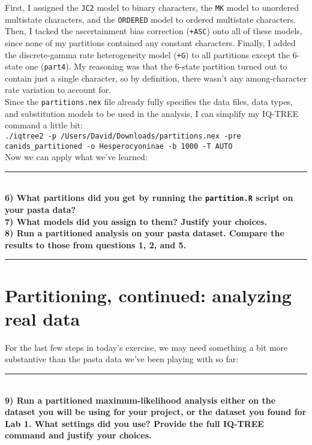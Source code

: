 \documentclass[12pt]{article}
\begin{document}
\noindent First, I assigned the \texttt{JC2} model to binary characters, the \texttt{MK} model to unordered multistate characters, and the \texttt{ORDERED} model to ordered multistate characters. Then, I tacked the ascertainment bias correction (\texttt{+ASC}) onto all of these models, since none of my partitions contained any constant characters. Finally, I added the discrete-gamma rate heterogeneity model (\texttt{+G}) to all partitions except the 6-state one (\texttt{part4}). My reasoning was that the 6-state partition turned out to contain just a single character, so by definition, there wasn't any among-character rate variation to account for. \\

\noindent Since the \texttt{partitions.nex} file already fully specifies the data files, data types, and substitution models to be used in the analysis, I can simplify my IQ-TREE command a little bit: \\

\texttt{./iqtree2 -p /Users/David/Downloads/partitions.nex -pre canids\_partitioned -o Hesperocyoninae -b 1000 -T AUTO} \\

\noindent Now we can apply what we've learned: \\

\hrule
\ \\[1ex]
\textbf{6) What partitions did you get by running the \texttt{partition.R} script on your pasta data?} \\

\noindent\textbf{7) What models did you assign to them? Justify your choices.} \\

\noindent\textbf{8) Run a partitioned analysis on your pasta dataset. Compare the results to those from questions 1, 2, and 5.} \\
\hrule

\section*{Partitioning, continued: analyzing real data}

\noindent For the last few steps in today's exercise, we may need something a bit more substantive than the pasta data we've been playing with so far: \\

\hrule
\ \\[1ex]
\textbf{9) Run a partitioned maximum-likelihood analysis either on the dataset you will be using for your project, or the dataset you found for Lab 1. What settings did you use? Provide the full IQ-TREE command and justify your choices.} \\
\end{document}
